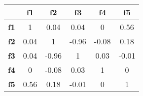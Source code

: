 \begin{tabular}{|l|c|c|c|c|c|}
\hline
&\textbf{f1}&\textbf{f2}&\textbf{f3}&\textbf{f4}&\textbf{f5}\\\hline
\textbf{f1}&1&0.04&0.04&0&0.56\\\hline
\textbf{f2}&0.04&1&-0.96&-0.08&0.18\\\hline
\textbf{f3}&0.04&-0.96&1&0.03&-0.01\\\hline
\textbf{f4}&0&-0.08&0.03&1&0\\\hline
\textbf{f5}&0.56&0.18&-0.01&0&1\\\hline
\end{tabular}
